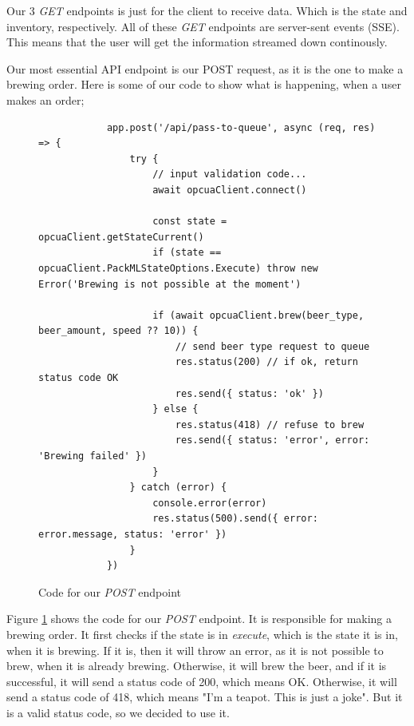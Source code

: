 Our 3 \textit{GET} endpoints is just for the client to receive data. Which is the state and inventory, respectively.
All of these \textit{GET} endpoints are server-sent events (SSE). This means that the user will get the information streamed down continously. \newline

Our most essential API endpoint is our POST request, as it is the one to make a brewing order. Here is some of our code to show what is happening, when a user makes an order;

\begin{center}
    \centering
    \begin{figure}[H]
        \begin{verbatim}
            app.post('/api/pass-to-queue', async (req, res) => {
                try {
                    // input validation code...
                    await opcuaClient.connect()
        
                    const state = opcuaClient.getStateCurrent()
                    if (state == opcuaClient.PackMLStateOptions.Execute) throw new Error('Brewing is not possible at the moment')
        
                    if (await opcuaClient.brew(beer_type, beer_amount, speed ?? 10)) {
                        // send beer type request to queue
                        res.status(200) // if ok, return status code OK
                        res.send({ status: 'ok' })
                    } else {
                        res.status(418) // refuse to brew
                        res.send({ status: 'error', error: 'Brewing failed' })
                    }
                } catch (error) {
                    console.error(error)
                    res.status(500).send({ error: error.message, status: 'error' })
                }
            })
        \end{verbatim}
        \caption{Code for our \textit{POST} endpoint}
        \label{fig:pass_to_queue_api}
    \end{figure}
\end{center}
Figure \ref{fig:pass_to_queue_api} shows the code for our \textit{POST} endpoint. It is responsible for making a brewing order. It first checks if the state is in \textit{execute}, which is the state it is in, when it is brewing. If it is, then it will throw an error, as it is not possible to brew, when it is already brewing. Otherwise, it will brew the beer, and if it is successful, it will send a status code of 200, which means OK. Otherwise, it will send a status code of 418, which means "I'm a teapot. This is just a joke". But it is a valid status code, so we decided to use it.

